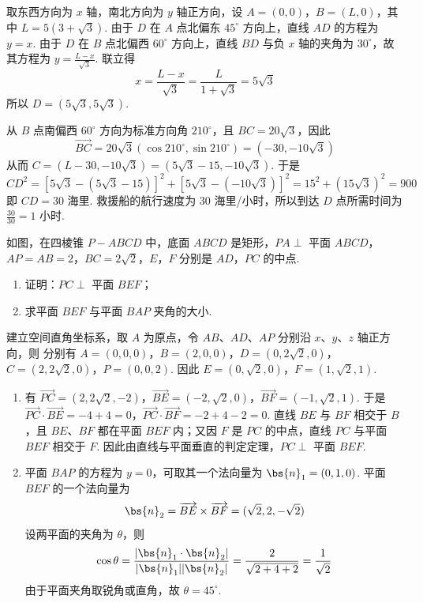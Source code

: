 \begin{solution}
取东西方向为 \(x\) 轴，南北方向为 \(y\) 轴正方向，设 \(A=(0,0)\)，\(B=(L,0)\)，其中 \(L=5(3+\sqrt{3})\). 由于 \(D\) 在 \(A\) 点北偏东 \(45^\circ\) 方向上，直线 \(AD\) 的方程为 \(y=x\). 由于 \(D\) 在 \(B\) 点北偏西 \(60^\circ\) 方向上，直线 \(BD\) 与负 \(x\) 轴的夹角为 \(30^\circ\)，故其方程为 \(y=\frac{L-x}{\sqrt{3}}\). 联立得
\[
x=\frac{L-x}{\sqrt{3}}=\frac{L}{1+\sqrt{3}}=5\sqrt{3}
\]
所以 \(D=(5\sqrt{3},5\sqrt{3})\).

从 \(B\) 点南偏西 \(60^\circ\) 方向为标准方向角 \(210^\circ\)，且 \(BC=20\sqrt{3}\)，因此
\[
\overrightarrow{BC}=20\sqrt{3}(\cos210^\circ,\sin210^\circ)=(-30,-10\sqrt{3})
\]
从而 \(C=(L-30,-10\sqrt{3})=(5\sqrt{3}-15,-10\sqrt{3})\). 于是
\[
CD^2=\left[5\sqrt{3}-(5\sqrt{3}-15)\right]^2+\left[5\sqrt{3}-(-10\sqrt{3})\right]^2=15^2+(15\sqrt{3})^2=900
\]
即 \(CD=30\) 海里. 救援船的航行速度为 \(30\) 海里/小时，所以到达 \(D\) 点所需时间为 \(\frac{30}{30}=1\) 小时.
\end{solution}

\begin{problem}
如图，在四棱锥 \(P - ABCD\) 中，底面 \(ABCD\) 是矩形，\(PA \perp\) 平面 \(ABCD\)，\(AP = AB = 2\)，\(BC = 2\sqrt{2}\)，\(E\)，\(F\) 分别是 \(AD\)，\(PC\) 的中点.

\begin{enumerate}
\item 证明：\(PC \perp\) 平面 \(BEF\)；
\item 求平面 \(BEF\) 与平面 \(BAP\) 夹角的大小.
\end{enumerate}

\end{problem}

\begin{solution}
建立空间直角坐标系，取 \(A\) 为原点，令 \(AB\)、\(AD\)、\(AP\) 分别沿 \(x\)、\(y\)、\(z\) 轴正方向，则
分别有 \(A=(0,0,0)\)，\(B=(2,0,0)\)，\(D=(0,2\sqrt{2},0)\)，\(C=(2,2\sqrt{2},0)\)，\(P=(0,0,2)\).
因此 \(E=(0,\sqrt{2},0)\)，\(F=(1,\sqrt{2},1)\).

\begin{enumerate}
\item 有 \(\overrightarrow{PC}=(2,2\sqrt{2},-2)\)，\(\overrightarrow{BE}=(-2,\sqrt{2},0)\)，\(\overrightarrow{BF}=(-1,\sqrt{2},1)\).
于是 \(\overrightarrow{PC}\cdot\overrightarrow{BE}=-4+4=0\)，\(\overrightarrow{PC}\cdot\overrightarrow{BF}=-2+4-2=0\).
直线 \(BE\) 与 \(BF\) 相交于 \(B\)，且 \(BE\)、\(BF\) 都在平面 \(BEF\) 内；又因 \(F\) 是 \(PC\) 的中点，直线 \(PC\) 与平面 \(BEF\) 相交于 \(F\). 因此由直线与平面垂直的判定定理，\(PC\perp\) 平面 \(BEF\).
\item 平面 \(BAP\) 的方程为 \(y=0\)，可取其一个法向量为 \(\bs{n}_1=(0,1,0)\). 平面 \(BEF\) 的一个法向量为
\[
\bs{n}_2=\overrightarrow{BE}\times\overrightarrow{BF}=(\sqrt{2},2,-\sqrt{2})
\]
设两平面的夹角为 \(\theta\)，则
\[
\cos\theta=\frac{|\bs{n}_1\cdot\bs{n}_2|}{|\bs{n}_1||\bs{n}_2|}=\frac{2}{\sqrt{2+4+2}}=\frac{1}{\sqrt{2}}
\]
由于平面夹角取锐角或直角，故 \(\theta=45^\circ\).
\end{enumerate}
\end{solution}

